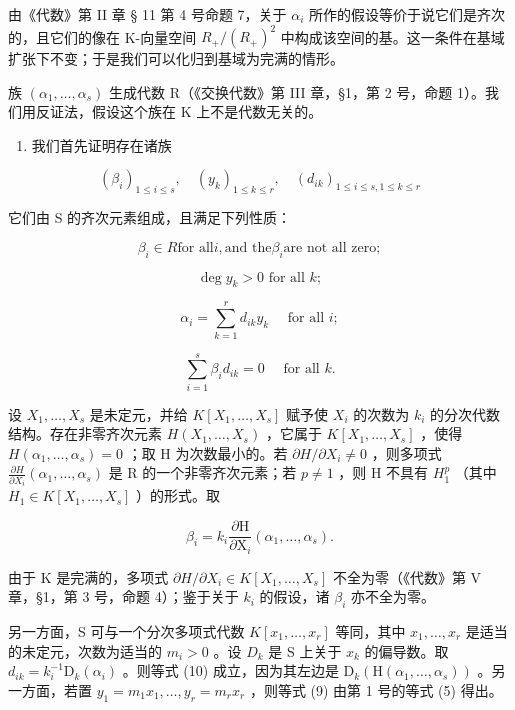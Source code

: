 由《代数》第 II 章 § 11 第 4 号命题 7，关于 \(\alpha_{i}\) 所作的假设等价于说它们是齐次的，且它们的像在 K-向量空间 \(R_{+}/(R_{+})^{2}\) 中构成该空间的基。这一条件在基域扩张下不变；于是我们可以化归到基域为完满的情形。

族 \((\alpha_{1},\ldots,\alpha_{s})\) 生成代数 R（《交换代数》第 III 章，§1，第 2 号，命题 1）。我们用反证法，假设这个族在 K 上不是代数无关的。

\begin{enumerate}
\def\labelenumi{\arabic{enumi})}
\tightlist
\item
  我们首先证明存在诸族
\end{enumerate}

\[
\left(\beta_ {i}\right) _ {1 \leqslant i \leqslant s}, \quad \left(y _ {k}\right) _ {1 \leqslant k \leqslant r}, \quad \left(d _ {i k}\right) _ {1 \leqslant i \leqslant s, 1 \leqslant k \leqslant r}
\]

它们由 S 的齐次元素组成，且满足下列性质：

\[
\beta_ {i} \in R \text {for all} i, \text {and the} \beta_ {i} \text {are not all zero};\tag{7}
\]

\[
\deg y _ {k} > 0 \text {   for   all   } k;\tag{8}
\]

\[
\alpha_ {i} = \sum_ {k = 1} ^ {r} d _ {i k} y _ {k} \quad \text { for   all } i;\tag{9}
\]

\[
\sum_ {i = 1} ^ {s} \beta_ {i} d _ {i k} = 0 \quad \text { for   all } k.\tag{10}
\]

设 \(X_{1},\ldots,X_{s}\) 是未定元，并给 \(K[X_{1},\ldots,X_{s}]\) 赋予使 \(X_{i}\) 的次数为 \(k_{i}\) 的分次代数结构。存在非零齐次元素 \(H(X_{1},\ldots,X_{s})\) ，它属于 \(K[X_{1},\ldots,X_{s}]\) ，使得 \(H(\alpha_{1},\ldots,\alpha_{s})=0\) ；取 H 为次数最小的。若 \(\partial H/\partial X_{i}\neq0\) ，则多项式 \(\frac{\partial H}{\partial X_{i}}(\alpha_{1},\ldots,\alpha_{s})\) 是 R 的一个非零齐次元素；若 \(p\neq1\) ，则 H 不具有 \(H_{1}^{p}\) （其中 \(H_{1}\in K[X_{1},\ldots,X_{s}]\) ）的形式。取

\[
\beta_ {i} = k _ {i} \frac {\partial \mathrm{H}}{\partial \mathrm{X} _ {i}} (\alpha_ {1}, \dots , \alpha_ {s}).
\]

由于 K 是完满的，多项式 \(\partial H/\partial X_{i} \in K[X_{1},\ldots,X_{s}]\) 不全为零（《代数》第 V 章，§1，第 3 号，命题 4）；鉴于关于 \(k_{i}\) 的假设，诸 \(\beta_{i}\) 亦不全为零。

另一方面，S 可与一个分次多项式代数 \(K[x_{1},\ldots,x_{r}]\) 等同，其中 \(x_{1},\ldots,x_{r}\) 是适当的未定元，次数为适当的 \(m_{i}>0\) 。设 \(D_{k}\) 是 S 上关于 \(x_{k}\) 的偏导数。取 \(d_{ik} = k_i^{-1}\mathrm{D}_k(\alpha_i)\) 。则等式 (10) 成立，因为其左边是 \(\mathrm{D}_k(\mathrm{H}(\alpha_1,\dots ,\alpha_s))\) 。另一方面，若置 \(y_{1} = m_{1}x_{1},\ldots ,y_{r} = m_{r}x_{r}\) ，则等式 (9) 由第 1 号的等式 (5) 得出。

